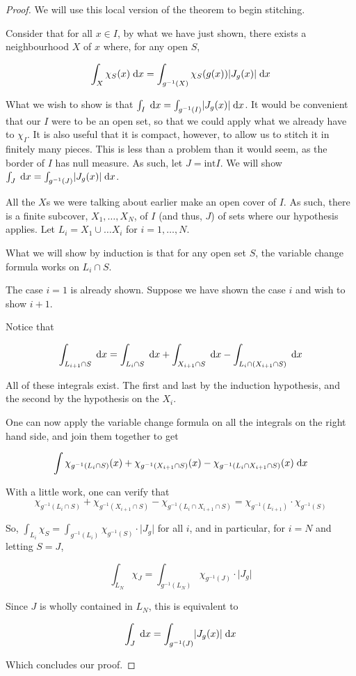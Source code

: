 \documentclass[11pt]{article}
\theoremstyle{definition}
\theoremstyle{plain}
\newcommand{\mo}{^{-1}}
\begin{document}
\begin{proof}
We will use this local version of the theorem to begin stitching.

Consider that for all $x \in I$, by what we have just shown, there exists a neighbourhood $X$ of $x$ where, for any open $S$,

\[ \int_X \chi_S(x) \d x = \int_{g\mo(X)} \chi_S(g(x)) \rvert J_g(x) \lvert \d x \]

What we wish to show is that $\int_I \d x = \int_{g\mo(I)} \rvert J_g(x) \lvert \d x$. It would be convenient that our $I$ were to be an open set, so that we could apply what we already have to $\chi_I$. It is also useful that it is compact, however, to allow us to stitch it in finitely many pieces. This is less than a problem than it would seem, as the border of $I$ has null measure. As such, let $J = \textrm{int} I$. We will show $\int_J \d x = \int_{g\mo(J)} \rvert J_g(x) \lvert \d x$.

All the $X$s we were talking about earlier make an open cover of $I$. As such, there is a finite subcover, $X_1, \ldots, X_N$, of $I$ (and thus, $J$) of sets where our hypothesis applies. Let $L_i = X_1 \cup \ldots X_i$ for $i = 1, \ldots, N$.

What we will show by induction is that for any open set $S$, the variable change formula works on $L_i \cap S$.

The case $i = 1$ is already shown. Suppose we have shown the case $i$ and wish to show $i+1$.

Notice that

\[\int_{L_{i+1} \cap S} \d x = \int_{L_i \cap S} \d x + \int_{X_{i+1} \cap S} \d x  - \int_{L_i \cap (X_{i+1} \cap S)} \d x\]

All of these integrals exist. The first and last by the induction hypothesis, and the second by the hypothesis on the $X_i$.

One can now apply the variable change formula on all the integrals on the right hand side, and join them together to get

\[ \int \chi_{g\mo(L_i \cap S)}(x) + \chi_{g\mo(X_{i+1} \cap S)}(x) - \chi_{g\mo(L_i \cap X_{i+1}\cap S)}(x) \d x \]

With a little work, one can verify that
\[\chi_{g\mo(L_i \cap S)} + \chi_{g\mo(X_{i+1} \cap S)} - \chi_{g\mo(L_i \cap X_{i+1}\cap S)} = \chi_{g\mo(L_{i+1})} \cdot \chi_{g\mo(S)}\]

So, $\int_{L_i} \chi_S = \int_{g\mo(L_i)} \chi_{g\mo(S)} \cdot \lvert J_g \rvert$ for all $i$, and in particular, for $i = N$ and letting $S = J$,

\[ \int_{L_N} \chi_J = \int_{g\mo(L_N)} \chi_{g\mo(J)} \cdot \lvert J_g \rvert \]

Since $J$ is wholly contained in $L_N$, this is equivalent to

\[ \int_J \d x = \int_{g\mo(J)} \lvert J_g(x) \rvert \d x \]

Which concludes our proof.

\end{proof}
\end{document}
